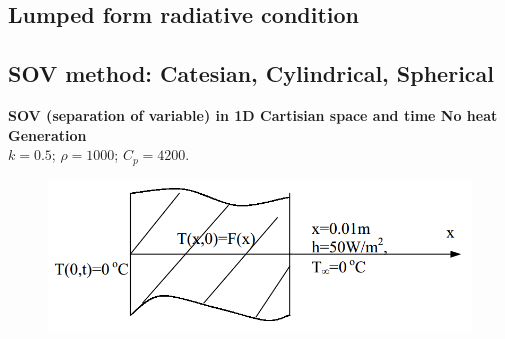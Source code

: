 \begin{appendices}
\subsection{Lumped form radiative condition}

\subsection{SOV method: Catesian, Cylindrical, Spherical}
\begin{example}
\textbf{ SOV (separation of variable) in 1D Cartisian space and time
No heat Generation}\\
$k = 0.5$; $\rho=1000$; $C_p = 4200$.
\begin{figure}[H]
  \centering
    \includegraphics[scale=0.5]{figures/appendixA/5}
\end{figure}


\end{example}
\end{appendices}
